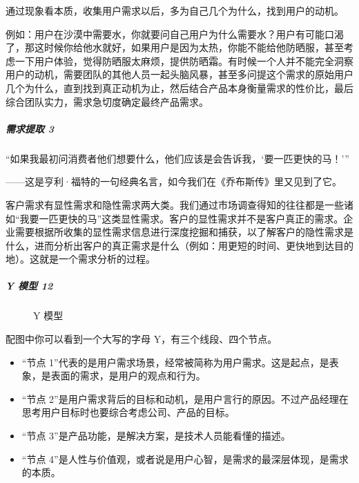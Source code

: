 \documentclass[letterpaper,11pt,english]{sphinxmanual}
\begin{document}
通过现象看本质，收集用户需求以后，多为自己几个为什么，找到用户的动机。

例如：用户在沙漠中需要水，你就要问自己用户为什么需要水？用户有可能口渴了，那这时候你给他水就好，如果用户是因为太热，你能不能给他防晒服，甚至考虑一下用户体验，觉得防晒服太麻烦，提供防晒霜。有时候一个人并不能完全洞察用户的动机，需要团队的其他人员一起头脑风暴，甚至多问提这个需求的原始用户几个为什么，直到找到真正动机为止，然后结合产品本身衡量需求的性价比，最后综合团队实力，需求急切度确定最终产品需求。


\subparagraph{需求提取 3\sphinxfootnotemark[160]}
\label{\detokenize{chapter_skill/users_analysis:id21}}%
\begin{footnotetext}[160]\sphinxAtStartFootnote
{}
%
\end{footnotetext}\ignorespaces 
“如果我最初问消费者他们想要什么，他们应该是会告诉我，‘要一匹更快的马！’”

——这是亨利·福特的一句经典名言，如今我们在《乔布斯传》里又见到了它。

客户需求有显性需求和隐性需求两大类。我们通过市场调查得知的往往都是一些诸如“我要一匹更快的马”这类显性需求。客户的显性需求并不是客户真正的需求。企业需要根据所收集的显性需求信息进行深度挖掘和捕获，以了解客户的隐性需求是什么，进而分析出客户的真正需求是什么（例如：用更短的时间、更快地到达目的地）。这就是一个需求分析的过程。


\subparagraph{Y 模型 12\sphinxfootnotemark[161]}
\label{\detokenize{chapter_skill/users_analysis:y-12}}%
\begin{footnotetext}[161]\sphinxAtStartFootnote
{}
%
\end{footnotetext}\ignorespaces 
\begin{figure}[H]
\centering
\capstart

\noindent{}
\caption{Y 模型}\label{\detokenize{chapter_skill/users_analysis:id32}}\end{figure}

配图中你可以看到一个大写的字母 Y，有三个线段、四个节点。
\begin{itemize}
\item {} 
“节点
1”代表的是用户需求场景，经常被简称为用户需求。这是起点，是表象，是表面的需求，是用户的观点和行为。

\item {} 
“节点
2”是用户需求背后的目标和动机，是用户言行的原因。不过产品经理在思考用户目标时也要综合考虑公司、产品的目标。

\item {} 
“节点 3”是产品功能，是解决方案，是技术人员能看懂的描述。

\item {} 
“节点
4”是人性与价值观，或者说是用户心智，是需求的最深层体现，是需求的本质。

\end{itemize}
\end{document}
